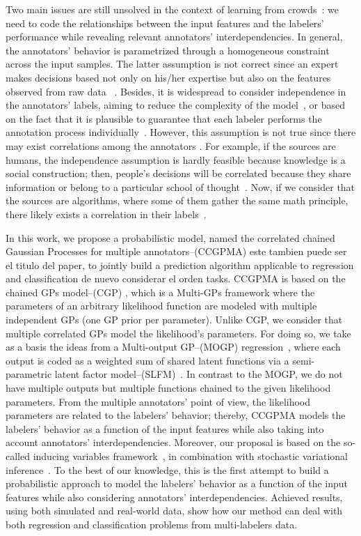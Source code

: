 \documentclass[journal]{IEEEtran}
\newcommand{\comment}[2]{{\color{blue}#1} {\color{red}#2}}
\begin{document}
Two main issues are still unsolved in the context of learning from crowds~\cite{g2019machine}: we need to code the relationships between the input
features and the labelers' performance while revealing relevant annotators' interdependencies. In general,  the annotators' behavior is parametrized through a homogeneous constraint across the input samples. The latter assumption is not correct since an expert makes decisions based not only on his/her expertise but also on the features observed from raw data ~\cite{raykar2010learning}. Besides, it is
widespread to consider independence in the annotators' labels, aiming
to reduce the complexity of the model~\cite{venanzi2014community}, or
based on the fact that it is plausible to guarantee that each labeler
performs the annotation process
individually~\cite{tang2019leveraging}. However, this assumption is
not true since there may exist correlations among the
annotators \cite{zhang2011learning}. For example, if the sources are
humans, the independence assumption is hardly feasible because
knowledge is a social construction; then, people's decisions will be
correlated because they share information or belong to a particular school of
thought~\cite{surowiecki2005wisdom,hahn2018communication}. Now, if we consider that the sources are algorithms, where some of them gather the same math principle, there likely exists a
correlation in their labels~\cite{zhu2019unsupervised}. 

In this work, we propose a probabilistic model, named the
\comment{correlated chained Gaussian Processes for multiple
  annotators--(CCGPMA)}{este tambien puede ser el titulo del paper},
to jointly build a prediction algorithm applicable to
\comment{regression and classification}{de nuevo considerar el orden} tasks. CCGPMA is based on the chained GPs model--(CGP) \cite{saul2016chained}, which is a Multi-GPs framework where the
parameters of an arbitrary likelihood function are modeled with
multiple independent GPs (one GP prior per parameter). Unlike CGP, we consider that multiple correlated GPs model the likelihood's parameters. For doing so, we take as a basis the ideas from a Multi-output GP--(MOGP) regression~\cite{alvarez2012kernels}, where each output is coded as a weighted sum of shared latent functions via a semi-parametric latent factor model--(SLFM)~\cite{teh2005semiparametric}. In contrast to the MOGP, we do not have multiple outputs but multiple functions chained to the given likelihood parameters. From the multiple annotators' point of view, the likelihood parameters are related to the labelers' behavior; thereby, CCGPMA models the labelers' behavior as a function of the input features while also taking into account annotators' interdependencies. Moreover, our proposal is based on the so-called inducing variables framework~\cite{alvarez2010efficient}, in combination with stochastic variational inference~\cite{hoffman2013stochastic}. To the best of our knowledge, this is the first attempt to build a probabilistic approach to model the labelers' behavior as a function of the input features while also considering annotators' interdependencies. Achieved results, using both simulated and real-world data, show how our method can deal with both regression and classification problems from multi-labelers data.
\end{document}
